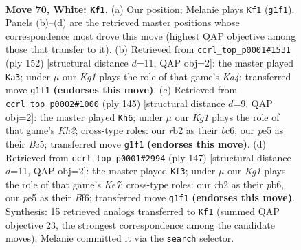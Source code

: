 \documentclass[11pt]{article}
\begin{document}
\clearpage

\begin{figure}[p]\centering
\begin{subfigure}{0.46\textwidth}\centering
\resizebox{\linewidth}{!}{%
\newchessgame
\chessboard[
  setfen={8/4k3/8/4p1p1/5p2/5B2/1r6/6K1 w - - 51 70},
  showmover=false,
  pgfstyle=straightmove, color=movearrow, markmove={g1-f1}
]}
\caption{}
\end{subfigure}\hfill
\begin{subfigure}{0.46\textwidth}\centering
\resizebox{\linewidth}{!}{%
\newchessgame
\chessboard[
  setfen={8/5p2/6p1/6B1/K5P1/8/5k2/8 w - - 4 77},
  showmover=false,
  pgfstyle=straightmove, color=movearrow, markmove={a4-a3}
]}
\caption{}
\end{subfigure}
\\[4pt]
\begin{subfigure}{0.46\textwidth}\centering
\resizebox{\linewidth}{!}{%
\newchessgame
\chessboard[
  setfen={8/7k/2B5/2b4p/5P1P/6P1/8/5K2 b - - 14 73},
  showmover=false,
  pgfstyle=straightmove, color=movearrow, markmove={h7-h6}
]}
\caption{}
\end{subfigure}\hfill
\begin{subfigure}{0.46\textwidth}\centering
\resizebox{\linewidth}{!}{%
\newchessgame
\chessboard[
  setfen={8/8/KP3b1p/7P/6P1/8/4k3/8 b - - 0 74},
  showmover=false,
  pgfstyle=straightmove, color=movearrow, markmove={e2-f3}
]}
\caption{}
\end{subfigure}
\caption{\textbf{Move 70, White: \texttt{Kf1}.} (a) Our position; Melanie plays \texttt{Kf1} (\texttt{g1f1}). Panels (b)--(d) are the retrieved master positions whose correspondence most drove this move (highest QAP objective among those that transfer to it). (b) Retrieved from \texttt{ccrl\_top\_p0001\#1531} (ply 152) [structural distance $d$=11, QAP obj=2]: the master played \texttt{Ka3}; under $\mu$ our \emph{Kg1} plays the role of that game's \emph{Ka4}; transferred move \texttt{g1f1} \textbf{(endorses this move)}. (c) Retrieved from \texttt{ccrl\_top\_p0002\#1000} (ply 145) [structural distance $d$=9, QAP obj=2]: the master played \texttt{Kh6}; under $\mu$ our \emph{Kg1} plays the role of that game's \emph{Kh2}; cross-type roles: our \emph{r}b2 as their \emph{b}c6, our \emph{p}e5 as their \emph{B}c5; transferred move \texttt{g1f1} \textbf{(endorses this move)}. (d) Retrieved from \texttt{ccrl\_top\_p0001\#2994} (ply 147) [structural distance $d$=11, QAP obj=2]: the master played \texttt{Kf3}; under $\mu$ our \emph{Kg1} plays the role of that game's \emph{Ke7}; cross-type roles: our \emph{r}b2 as their \emph{p}b6, our \emph{p}e5 as their \emph{B}f6; transferred move \texttt{g1f1} \textbf{(endorses this move)}. Synthesis: 15 retrieved analogs transferred to \texttt{Kf1} (summed QAP objective 23, the strongest correspondence among the candidate moves); Melanie committed it via the \texttt{search} selector.}
\label{fig:thought-m138}
\end{figure}
\end{document}

